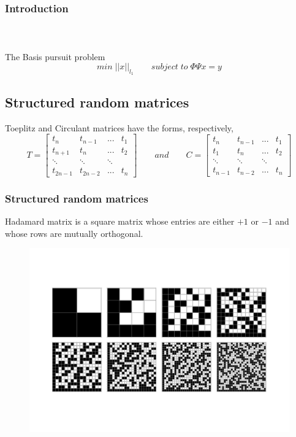 
\begin{frame}[t]
\frametitle{Introduction}
\framesubtitle{~~}  %

The Basis pursuit problem 
\begin{equation}
min  \;||x||_{l_1} \qquad   subject \; to \; \Phi \Psi x=y
\end{equation}

\subsection*{Structured random matrices}
Toeplitz and Circulant matrices have the forms, respectively,
\\


$$
T = \begin{bmatrix}
	t_{n} & t_{n-1} & ...& t_{1}           \\[0.3em]
	t_{n+1} & t_n & ... & t_{2} \\[0.3em]
	\ddots &\ddots & \ddots &    \\[0.3em]
	t_{2n-1} & t_{2n-2}& ... & t_{n}         
\end{bmatrix}
\qquad and \qquad
C = \begin{bmatrix}
t_{n} & t_{n-1} & ...& t_{1}           \\[0.3em]
t_{1} & t_{n} & ... & t_{2} \\[0.3em]
\ddots &\ddots & \ddots &      \\[0.3em]
t_{n-1} & t_{n-2}& ... & t_{n}        
\end{bmatrix} 
$$
\end{frame}
\begin{frame}[t]
	\frametitle{Structured random matrices}
	 Hadamard matrix is a square matrix whose entries are either $+1$ or $−1$ and whose rows are mutually orthogonal.
\begin{figure}[h]
\centering
\includegraphics[width=0.7\linewidth]{HadamardMatrices_800}
\caption{}
\label{fig:HadamardMatrices_800}
\end{figure}

\end{frame}
